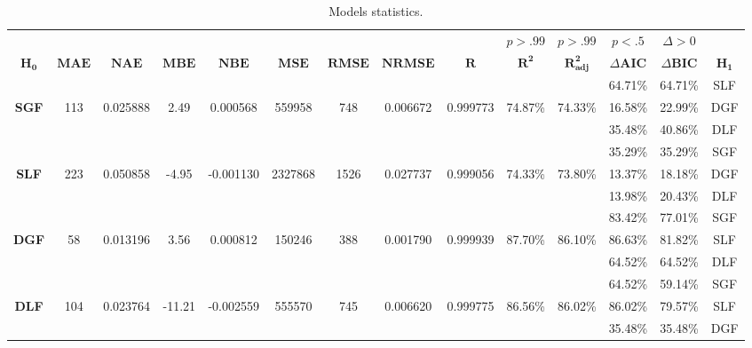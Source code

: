 
\begin{table}
  \begin{center}
    \caption{Models statistics.}
    \label{tab:table1}
    \resizebox{\textwidth}{!} {
    \begin{tabular}{c|c|c|c|c|c|c|c|c|c|c|c|c|c}
        \toprule
        & & & & & & & & & $p>.99$ & $p>.99$ & $p<.5$ & $\Delta > 0$ & \\
        $\mathbf{H_0}$ &
        $\mathbf{MAE}$ & $\mathbf{NAE}$ & 
        $\mathbf{MBE}$ & $\mathbf{NBE}$ & 
        $\mathbf{MSE}$ & $\mathbf{RMSE}$ &
        $\mathbf{NRMSE}$ & $\mathbf{R}$ &
        $\mathbf{R^2}$ & $\mathbf{R^2_{adj}}$ &
        $\Delta \mathbf{AIC}$ & $\Delta \mathbf{BIC}$ &
        $\mathbf{H_1}$ \\

        \midrule
         & & & & & & & & & & & 64.71\% & 64.71\% & SLF \\
         \textbf{SGF} & 
             113 & 0.025888 & 
             2.49 & 0.000568 & 
             559958 & 748 & 
             0.006672 & 0.999773 & 
             74.87\% & 
             74.33\% & 
             16.58\% & 22.99\% & DGF \\
         & & & & & & & & & & & 35.48\% & 40.86\% & DLF \\

        \midrule
         & & & & & & & & & & & 35.29\% & 35.29\% & SGF \\
         \textbf{SLF} & 
             223 & 0.050858 & 
             -4.95 & -0.001130 & 
             2327868 & 1526 & 
             0.027737 & 0.999056 & 
             74.33\% & 
             73.80\% & 
             13.37\% & 18.18\% & DGF \\
         & & & & & & & & & & & 13.98\% & 20.43\% & DLF \\

        \midrule
         & & & & & & & & & & & 83.42\% & 77.01\% & SGF \\
         \textbf{DGF} & 
             58 & 0.013196 & 
             3.56 & 0.000812 & 
             150246 & 388 & 
             0.001790 & 0.999939 & 
             87.70\% & 
             86.10\% & 
             86.63\% & 81.82\% & SLF \\
         & & & & & & & & & & & 64.52\% & 64.52\% & DLF \\

        \midrule
         & & & & & & & & & & & 64.52\% & 59.14\% & SGF \\
         \textbf{DLF} & 
             104 & 0.023764 & 
             -11.21 & -0.002559 & 
             555570 & 745 & 
             0.006620 & 0.999775 & 
             86.56\% & 
             86.02\% & 
             86.02\% & 79.57\% & SLF \\
         & & & & & & & & & & & 35.48\% & 35.48\% & DGF \\

        \bottomrule
    \end{tabular} }
  \end{center}
\end{table}

